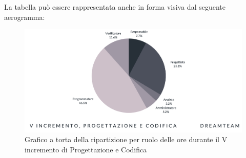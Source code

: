 La tabella può essere rappresentata anche in forma visiva dal seguente aerogramma:
\begin{figure}[H]
\centering
\includegraphics[scale=0.50]{Sezioni/SezioniPreventivo/grafici/progettazione/Progettazione_V_incremento_costi.png}
\caption{Grafico a torta della ripartizione per ruolo delle ore durante il V incremento di Progettazione e Codifica}
\end{figure}

\pagebreak


